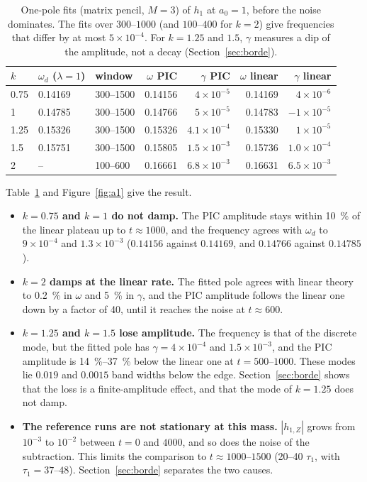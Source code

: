 \documentclass[11pt,a4paper]{article}
\begin{document}
\begin{table}[!htbp]
\centering
\small
\begin{tabular}{lllrrrr}
\toprule
$k$ & $\omega_d$ ($\lambda=1$) & window & $\omega$ PIC & $\gamma$ PIC & $\omega$ linear & $\gamma$ linear\\
\midrule
0.75 & 0.14169 & 300--1500 & 0.14156 & $4\times10^{-5}$ & 0.14169 & $4\times10^{-6}$\\
1 & 0.14785 & 300--1500 & 0.14766 & $5\times10^{-5}$ & 0.14783 & $-1\times10^{-5}$\\
1.25 & 0.15326 & 300--1500 & 0.15326 & $4.1\times10^{-4}$ & 0.15330 & $1\times10^{-5}$\\
1.5 & 0.15751 & 300--1500 & 0.15805 & $1.5\times10^{-3}$ & 0.15736 & $1.0\times10^{-4}$\\
2 & -- & 100--600 & 0.16661 & $6.8\times10^{-3}$ & 0.16631 & $6.5\times10^{-3}$\\
\bottomrule
\end{tabular}
\caption{One-pole fits (matrix pencil, $M=3$) of $h_1$ at $a_0=1$, before the noise dominates.
The fits over $300$--$1000$ (and $100$--$400$ for $k=2$) give frequencies that differ by at most
$5\times10^{-4}$. For $k=1.25$ and $1.5$, $\gamma$ measures a dip of the amplitude, not a decay
(Section~\ref{sec:borde}).}
\label{tab:polos}
\end{table}

Table~\ref{tab:polos} and Figure~\ref{fig:a1} give the result.
\begin{itemize}
\item \textbf{$k=0.75$ and $k=1$ do not damp.} The PIC amplitude stays within \SI{10}{\%} of
the linear plateau up to $t\approx1000$, and the frequency agrees with $\omega_d$ to $9\times10^{-4}$ and
$1.3\times10^{-3}$ ($0.14156$ against $0.14169$, and $0.14766$ against $0.14785$).
\item \textbf{$k=2$ damps at the linear rate.} The fitted pole agrees with linear theory to
\SI{0.2}{\%} in $\omega$ and \SI{5}{\%} in $\gamma$, and the PIC amplitude follows the linear one down
by a factor of 40, until it reaches the noise at $t\approx600$.
\item \textbf{$k=1.25$ and $k=1.5$ lose amplitude.} The frequency is that of the discrete mode,
but the fitted pole has $\gamma=4\times10^{-4}$ and $1.5\times10^{-3}$, and the PIC amplitude is
\SIrange{14}{37}{\%} below the linear one at $t=500$--$1000$. These modes lie $0.019$ and $0.0015$
band widths below the edge. Section~\ref{sec:borde} shows that the loss is a finite-amplitude
effect, and that the mode of $k=1.25$ does not damp.
\item \textbf{The reference runs are not stationary at this mass.} $|h_{1,Z}|$ grows from $10^{-3}$
to $10^{-2}$ between $t=0$ and $4000$, and so does the noise of the subtraction. This limits the
comparison to $t\approx1000$--$1500$ (20--40 $\tau_1$, with $\tau_1=37$--$48$).
Section~\ref{sec:borde} separates the two causes.
\end{itemize}
\end{document}
